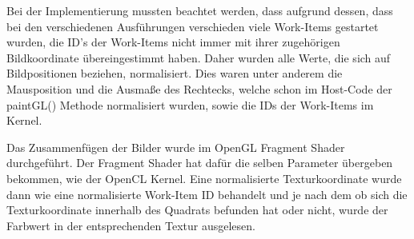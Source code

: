 Bei der Implementierung mussten beachtet werden, dass aufgrund dessen, dass bei den verschiedenen Ausführungen verschieden viele Work-Items gestartet wurden, die ID's der Work-Items nicht immer mit ihrer zugehörigen Bildkoordinate übereingestimmt haben.
Daher wurden alle Werte, die sich auf Bildpositionen beziehen, normalisiert.
Dies waren unter anderem die Mausposition und die Ausmaße des Rechtecks, welche schon im Host-Code der paintGL() Methode normalisiert wurden, sowie die IDs der Work-Items im Kernel.

Das Zusammenfügen der Bilder wurde im OpenGL Fragment Shader durchgeführt.
Der Fragment Shader hat dafür die selben Parameter übergeben bekommen, wie der OpenCL Kernel.
Eine normalisierte Texturkoordinate wurde dann wie eine normalisierte Work-Item ID behandelt und je nach dem ob sich die Texturkoordinate innerhalb des Quadrats befunden hat oder nicht, wurde der Farbwert in der entsprechenden Textur ausgelesen.

